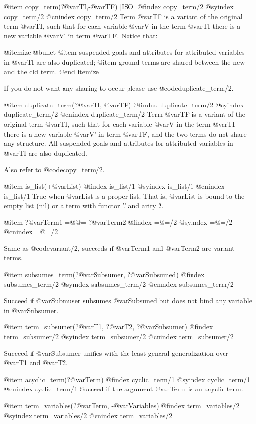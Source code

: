 {{{{@item copy_term(?@var{TI},-@var{TF}) [ISO]
@findex copy_term/2
@syindex copy_term/2
@cnindex copy_term/2
Term @var{TF} is a variant of the original term @var{TI}, such that for
each variable @var{V} in the term @var{TI} there is a new variable @var{V'}
in term @var{TF}. Notice that:

@itemize @bullet
@item suspended goals and attributes for attributed variables in
  @var{TI} are also duplicated;
@item ground terms are shared between the new and the old term.
@end itemize

If you do not want any sharing to occur please use
@code{duplicate_term/2}.

@item duplicate_term(?@var{TI},-@var{TF})
@findex duplicate_term/2
@syindex duplicate_term/2
@cnindex duplicate_term/2
Term @var{TF} is a variant of the original term @var{TI}, such that
for each variable @var{V} in the term @var{TI} there is a new variable
@var{V'} in term @var{TF}, and the two terms do not share any
structure. All suspended goals and attributes for attributed variables
in @var{TI} are also duplicated.

Also refer to @code{copy_term/2}.

@item is_list(+@var{List})
@findex is_list/1
@syindex is_list/1
@cnindex is_list/1
True when @var{List} is a proper list. That is, @var{List}
is bound to the empty list (nil) or a term with functor '.' and arity 2.

@item ?@var{Term1} =@@= ?@var{Term2}
@findex  =@=/2
@syindex =@=/2
@cnindex =@=/2

Same as @code{variant/2}, succeeds if @var{Term1} and @var{Term2} are variant terms.


@item subsumes_term(?@var{Subsumer}, ?@var{Subsumed})
@findex  subsumes_term/2
@syindex subsumes_term/2
@cnindex subsumes_term/2

Succeed if @var{Submuser} subsumes @var{Subsuned} but does not bind any
variable in @var{Subsumer}.

@item term_subsumer(?@var{T1}, ?@var{T2}, ?@var{Subsumer})
@findex  term_subsumer/2
@syindex term_subsumer/2
@cnindex term_subsumer/2

Succeed if @var{Subsumer} unifies with the least general
generalization over @var{T1} and
@var{T2}.

@item acyclic_term(?@var{Term})
@findex cyclic_term/1
@syindex cyclic_term/1
@cnindex cyclic_term/1
Succeed if the argument @var{Term} is an acyclic term.

@item term_variables(?@var{Term}, -@var{Variables})
@findex  term_variables/2
@syindex term_variables/2
@cnindex term_variables/2

}}}}
